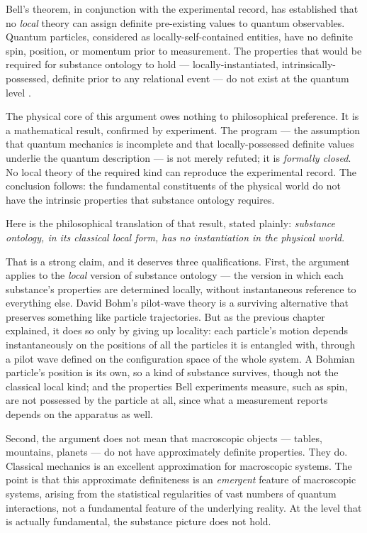 Bell's theorem, in conjunction with the experimental record, has established that no \emph{local} theory can assign definite pre-existing values to quantum observables. Quantum particles, considered as locally-self-contained entities, have no definite spin, position, or momentum prior to measurement. The properties that would be required for substance ontology to hold --- locally-instantiated, intrinsically-possessed, definite prior to any relational event --- do not exist at the quantum level \citep{Bell1964,Aspect1982,Zeilinger2023Nobel}.

The physical core of this argument owes nothing to philosophical preference. It is a mathematical result, confirmed by experiment. The \citet{Einstein1935EPR} program --- the assumption that quantum mechanics is incomplete and that locally-possessed definite values underlie the quantum description --- is not merely refuted; it is \emph{formally closed}. No local theory of the required kind can reproduce the experimental record. The conclusion follows: the fundamental constituents of the physical world do not have the intrinsic properties that substance ontology requires.

Here is the philosophical translation of that result, stated plainly: \emph{substance ontology, in its classical local form, has no instantiation in the physical world}.

That is a strong claim, and it deserves three qualifications. First, the argument applies to the \emph{local} version of substance ontology --- the version in which each substance's properties are determined locally, without instantaneous reference to everything else. David Bohm's pilot-wave theory \citep{Bohm1980} is a surviving alternative that preserves something like particle trajectories. But as the previous chapter explained, it does so only by giving up locality: each particle's motion depends instantaneously on the positions of all the particles it is entangled with, through a pilot wave defined on the configuration space of the whole system. A Bohmian particle's position is its own, so a kind of substance survives, though not the classical local kind; and the properties Bell experiments measure, such as spin, are not possessed by the particle at all, since what a measurement reports depends on the apparatus as well.

Second, the argument does not mean that macroscopic objects --- tables, mountains, planets --- do not have approximately definite properties. They do. Classical mechanics is an excellent approximation for macroscopic systems. The point is that this approximate definiteness is an \emph{emergent} feature of macroscopic systems, arising from the statistical regularities of vast numbers of quantum interactions, not a fundamental feature of the underlying reality. At the level that is actually fundamental, the substance picture does not hold.

